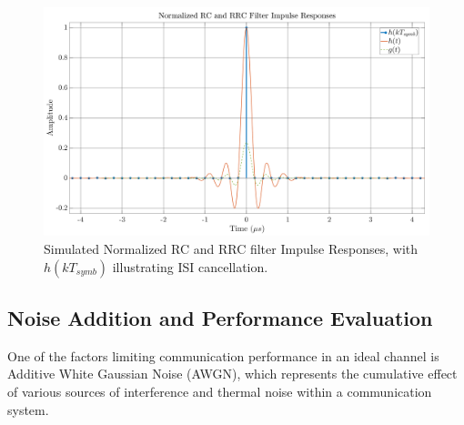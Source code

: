 \begin{figure}[H]
	\centering
	\includegraphics[width=0.9\linewidth]{Images/h-rc} 
	\caption{Simulated Normalized RC and RRC filter Impulse Responses, with $h(kT_{symb})$ illustrating ISI cancellation.}
	\label{fig:h-rc}
\end{figure}

\subsection{Noise Addition and Performance Evaluation}
One of the factors limiting communication performance in an ideal channel is Additive White Gaussian Noise (AWGN), which represents the cumulative effect of various sources of interference and thermal noise within a communication system.\par

